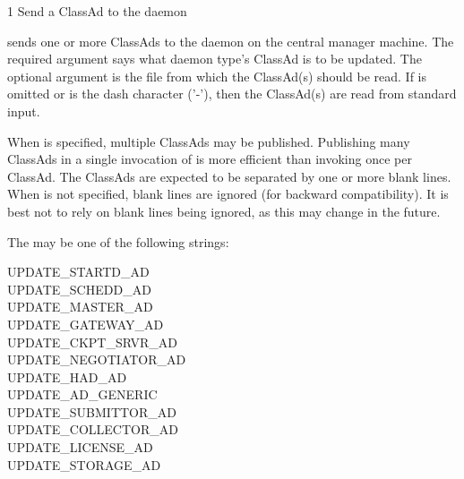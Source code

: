 \begin{ManPage}{\label{man-condor-advertise}}{1}
{Send a ClassAd to the  daemon}

\Synopsis {}
\ToolArgsBase


\Description
{} sends one or more ClassAds to the  daemon on
the central manager machine.
The required argument  says what daemon type's ClassAd
is to be updated.
The optional argument  is the file from which the
ClassAd(s) should be read.
If  is omitted or is the dash character ('-'),
then the ClassAd(s) are read from standard input.

When  is specified, multiple ClassAds may be published.
Publishing many ClassAds in a single invocation of  is
more efficient than invoking  once per ClassAd.
The ClassAds are expected to be separated by one or more blank lines.
When  is not specified, blank lines are ignored (for
backward compatibility).  
It is best not to rely on blank lines being ignored,
as this may change in the future.

The  may be one of the following strings:
\begin{description}
\item[UPDATE\_STARTD\_AD]
\item[UPDATE\_SCHEDD\_AD]
\item[UPDATE\_MASTER\_AD]
\item[UPDATE\_GATEWAY\_AD]
\item[UPDATE\_CKPT\_SRVR\_AD]
\item[UPDATE\_NEGOTIATOR\_AD]
\item[UPDATE\_HAD\_AD]
\item[UPDATE\_AD\_GENERIC]
\item[UPDATE\_SUBMITTOR\_AD]
\item[UPDATE\_COLLECTOR\_AD]
\item[UPDATE\_LICENSE\_AD]
\item[UPDATE\_STORAGE\_AD]
\end{description}


\end{ManPage}
